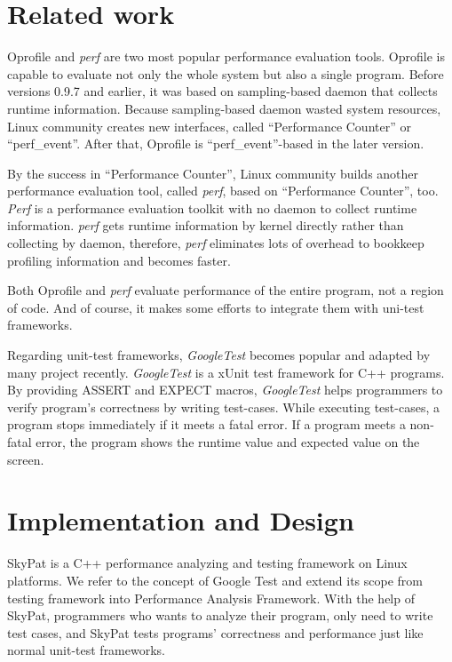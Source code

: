 \documentclass[final]{ols}
\begin{document}
\section{Related work}

Oprofile\cite{oprofile} and \textit{perf} are two most popular performance evaluation tools.
Oprofile is capable to evaluate not only the whole system but also a single program.
Before versions 0.9.7 and earlier, it was based on sampling-based daemon that collects runtime information.
Because sampling-based daemon wasted system resources, Linux community creates new interfaces, called ``Performance Counter''\cite{performance-counter-linux} or ``perf\_event''.
After that, Oprofile is ``perf\_event''-based in the later version.

By the success in ``Performance Counter'', Linux community builds another performance evaluation tool, called \textit{perf}, based on ``Performance Counter'', too.
\textit{Perf} is a performance evaluation toolkit with no daemon to collect runtime information.
\textit{perf} gets runtime information by kernel directly rather than collecting by daemon, therefore, \textit{perf} eliminates lots of overhead to bookkeep profiling information and becomes faster.

Both Oprofile and \textit{perf} evaluate performance of the entire program, not a region of code.
And of course, it makes some efforts to integrate them with uni-test frameworks.

Regarding unit-test frameworks, \textit{GoogleTest} becomes popular and adapted by many project recently.
\textit{GoogleTest} is a xUnit test framework for C++ programs.
By providing ASSERT and EXPECT macros, \textit{GoogleTest} helps programmers to verify program's correctness by writing test-cases.
While executing test-cases, a program stops immediately if it meets a fatal error.
If a program meets a non-fatal error, the program shows the runtime value and expected value on the screen.

\section{Implementation and Design}

SkyPat is a C++ performance analyzing and testing framework on Linux platforms.
We refer to the concept of Google Test and extend its scope from testing framework into Performance Analysis Framework.
With the help of SkyPat, programmers who wants to analyze their program, only need to write test cases, and SkyPat tests programs' correctness and performance just like normal unit-test frameworks.
\end{document}
